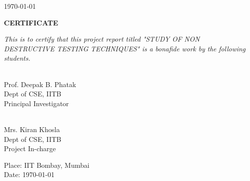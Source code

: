 \documentclass[12pt]{report}
\begin{document}
\begin{titlepage}
\begin{center}
\begin{multicols}{2}
\end{multicols}



\vfill
\today
\end{center}
\end{titlepage}


\thispagestyle{empty}

\begin{center}
\thispagestyle{empty}
\LARGE
\textbf{CERTIFICATE} \\
\end{center}
\vfill
\normalsize
\textit{This is to certify that this project report titled "STUDY OF NON DESTRUCTIVE TESTING TECHNIQUES" is a bonafide work by the following students.}
\vfill

\begin{multicols}{2}
\underline{\hspace{5cm}} \\
\indent Prof. Deepak B. Phatak \\
\indent Dept of CSE, IITB \\
\indent Principal Investigator \\

\begin{flushright}
\underline{\hspace{5cm}} \\
 Mrs. Kiran Khosla\\
\indent Dept of CSE, IITB \\
\indent Project In-charge \\
\end{flushright}
\end{multicols}

\vfill
%
% 
 
 \vfill
 Place: IIT Bombay, Mumbai \\
\indent Date: \today
\end{document}
